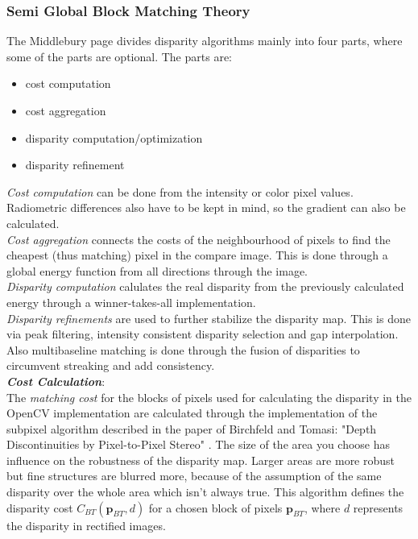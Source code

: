 \documentclass[a4paper]{article}
\begin{document}
\subsubsection{Semi Global Block Matching Theory}
\label{bm_theory}
The Middlebury page divides disparity algorithms mainly into four
parts, where some of the parts are optional. The parts are:
\begin{itemize}
\item cost computation
\item cost aggregation
\item disparity computation/optimization
\item disparity refinement
\end{itemize}
\noindent\textit{Cost computation} can be done from the intensity or color
pixel values. Radiometric differences also have to be kept in mind, so
the gradient can also be calculated.\\
\textit{Cost aggregation} connects the costs of the neighbourhood of
pixels to find the cheapest (thus matching) pixel in the compare
image. This is done through a global energy function from all
directions through the image.\\
\textit{Disparity computation} calulates the real disparity from the
previously calculated energy through a winner-takes-all
implementation.\\
\textit{Disparity refinements} are used to further stabilize the
disparity map. This is done via peak filtering, intensity consistent
disparity selection and gap interpolation. Also multibaseline matching
is done through the fusion of disparities to circumvent streaking and
add consistency.\\

\emph{\textbf{Cost Calculation}}:\\
The \emph{matching cost} for the blocks of pixels used for calculating
the disparity in the OpenCV implementation are calculated through the
implementation of the subpixel algorithm described in the paper of
Birchfeld and Tomasi: "Depth Discontinuities by Pixel-to-Pixel Stereo"
\cite{birchtom99}. The size of the area you choose has influence on
the robustness of the disparity map. Larger areas are more robust but
fine structures are blurred more, because of the assumption of the
same disparity over the whole area which isn't always true.  This
algorithm defines the disparity cost $C_{BT}( \mathbf{p}_{BT},d)$ for
a chosen block of pixels $\mathbf{p}_{BT}$, where $d$ represents the
disparity in rectified images.\\
\end{document}
